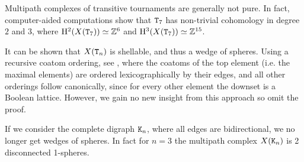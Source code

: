 \documentclass{amsart}
\begin{document}
\begin{rem}
Multipath complexes of transitive tournaments are generally not pure. In fact, computer-aided computations show that ${\tt T}_7$ has non-trivial cohomology in degree $2$ and $3$, where ${\rm H}^2(X({\tt T}_7))\simeq \mathbb Z^6$ and ${\rm H}^3(X({\tt T}_7))\simeq \mathbb Z^{15}$. 
\end{rem}

\begin{rem}
It can be shown that $X({\tt T}_n)$ is shellable, and thus a wedge of spheres. Using a recursive coatom ordering, see \cite[Section~4.2]{Wac07}, where the coatoms of the top element (i.e. the maximal elements) are ordered lexicographically by their edges, and all other orderings follow canonically, since for every other element the downset is a Boolean lattice. However, we gain no new insight from this approach so omit the proof.
\end{rem}
If we consider the complete digraph ${\tt K}_n$, where all edges are bidirectional, we no longer get wedges of spheres. In fact for $n=3$ the multipath complex $X({\tt K}_n)$ is 2 disconnected 1-spheres.








\end{document}
